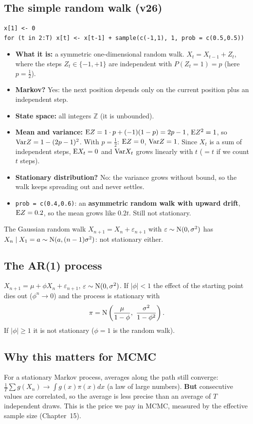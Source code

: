 \subsection{The simple random walk (v26)}
\begin{Verbatim}
x[1] <- 0
for (t in 2:T) x[t] <- x[t-1] + sample(c(-1,1), 1, prob = c(0.5,0.5))
\end{Verbatim}
\begin{itemize}
  \item \textbf{What it is:} a symmetric one-dimensional random walk. $X_t = X_{t-1}+Z_t$, where the steps $Z_t\in\{-1,+1\}$ are independent with $P(Z_t=1)=p$ (here $p=\frac12$).
  \item \textbf{Markov?} Yes: the next position depends only on the current position plus an independent step.
  \item \textbf{State space:} all integers $\mathbb Z$ (it is unbounded).
  \item \textbf{Mean and variance:} $\mathrm{E} Z = 1\cdot p + (-1)(1-p) = 2p-1$, $\mathrm{E} Z^2 = 1$, so $\mathrm{Var} Z = 1-(2p-1)^2$. With $p=\frac12$: $\mathrm{E} Z=0$, $\mathrm{Var} Z = 1$. Since $X_t$ is a sum of independent steps, $\mathrm{E} X_t = 0$ and $\mathrm{Var} X_t$ grows linearly with $t$ ($=t$ if we count $t$ steps).
  \item \textbf{Stationary distribution?} No: the variance grows without bound, so the walk keeps spreading out and never settles.
  \item \texttt{prob = c(0.4,0.6)}: an \textbf{asymmetric random walk with upward drift}, $\mathrm{E} Z = 0.2$, so the mean grows like $0.2t$. Still not stationary.
\end{itemize}
The Gaussian random walk $X_{n+1} = X_n + \varepsilon_{n+1}$ with $\varepsilon\sim\mathrm{N}(0,\sigma^2)$ has $X_n\mid X_1=a\sim\mathrm{N}(a,(n-1)\sigma^2)$: not stationary either.

\subsection{The AR(1) process}
$X_{n+1} = \mu + \phi X_n + \varepsilon_{n+1}$, $\varepsilon\sim\mathrm{N}(0,\sigma^2)$. If $|\phi|<1$ the effect of the starting point dies out ($\phi^n\to0$) and the process is stationary with
\[
\pi = \mathrm{N}\left(\frac{\mu}{1-\phi},\ \frac{\sigma^2}{1-\phi^2}\right).
\]
If $|\phi|\ge1$ it is not stationary ($\phi=1$ is the random walk).

\subsection{Why this matters for MCMC}
For a stationary Markov process, averages along the path still converge: $\frac1T\sum g(X_n)\to\int g(x)\pi(x)dx$ (a law of large numbers). \textbf{But} consecutive values are correlated, so the average is less precise than an average of $T$ independent draws. This is the price we pay in MCMC, measured by the effective sample size (Chapter~15).

\newpage
